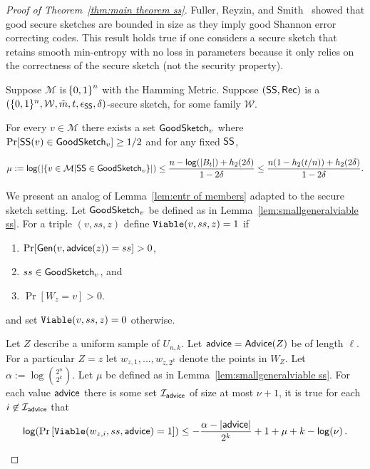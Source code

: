\begin{proof}[Proof of Theorem~\ref{thm:main theorem ss}]

Fuller, Reyzin, and Smith~\cite[Lemma 7.3]{fuller2020fuzzy} showed that good secure sketches are bounded in size as they imply good Shannon error correcting codes.  This result holds true if one considers a secure sketch that retains smooth min-entropy with no loss in parameters because it only relies on the correctness of the secure sketch (not the security property).  

\begin{lemma}
\label{lem:smallgeneralviable ss}
    Suppose $\mathcal{M}$ is $\!\left\{ 0,1 \right\}^{n}$ with the Hamming Metric. Suppose $({\mathsf{SS}}, {\mathsf{Rec}})$ is a $(\{0, 1\}^n, \mathcal{W}, \tilde{m}, t, \epsilon_{\mathsf{SS}}, \delta)$-secure sketch, for some family $\mathcal{W}$. 
    
   For every $v\in \mathcal{M}$ there exists a set $\mathsf{GoodSketch}_v$ where $\Pr[{\mathsf{SS}}(v)\in \mathsf{GoodSketch}_v] \ge 1/2$ and for any fixed ${\mathsf{SS}}$,
    
    \[
   \mu:= \mathsf{log}\!\left(|\{v \in \mathcal{M} | {\mathsf{SS}} \in \mathsf{GoodSketch}_v\}|\right) \le \frac{n - \mathsf{log}\!\left(|B_t|\right) +h_2(2\delta)}{1-2\delta} \le \frac{n(1-h_2(t/n)) +h_2(2\delta)}{1-2\delta}.
    \]
\end{lemma}

We present an analog of Lemma~\ref{lem:entr of members} adapted to the secure sketch setting. Let $\mathsf{GoodSketch}_v$ be defined as in Lemma~\ref{lem:smallgeneralviable ss}. For a triple $(v, ss, z)$ define $\mathtt{Viable}(v, ss, z)=1$ if
\begin{enumerate}
\itemsep0em
\item $\Pr[{\mathsf{Gen}}(v, {\mathsf{advice}}(z)) = ss]>0$,
\item $ss\in\mathsf{GoodSketch}_v$, and
\item $\Pr[W_z = v]>0$.
\end{enumerate}
and set $\mathtt{Viable}(v, ss, z)=0$ otherwise. 

\begin{lemma}
\label{lem:ent members ss}
Let $Z$ describe a uniform sample of $U_{n,k}$.  Let ${\mathsf{advice}} = {\mathsf{Advice}}(Z)$ be of length $\ell$.
 For a particular $Z=z$ let $w_{z,1},..., w_{z,2^k}$ denote the points in $W_Z$. Let $\alpha:= \log {2^n\choose 2^k}$.  Let $\mu$ be defined as in Lemma~\ref{lem:smallgeneralviable ss}. 
For each value ${\mathsf{advice}}$ there is some set $\mathcal{I}_{{\mathsf{advice}}}$ of size at most $\nu+1$, it is true for each $i\not \in \mathcal{I}_{\mathsf{advice}}$ that
\[
\mathsf{log}\!\left(\Pr\left[\mathtt{Viable}(w_{z,i}, ss, {\mathsf{advice}}) = 1 \right]\right)\le -\frac{\alpha -|{\mathsf{advice}}| }{2^k}+1+\mu+k-\mathsf{log}\!\left(\nu\right).
\]
\end{lemma}


\end{proof}
